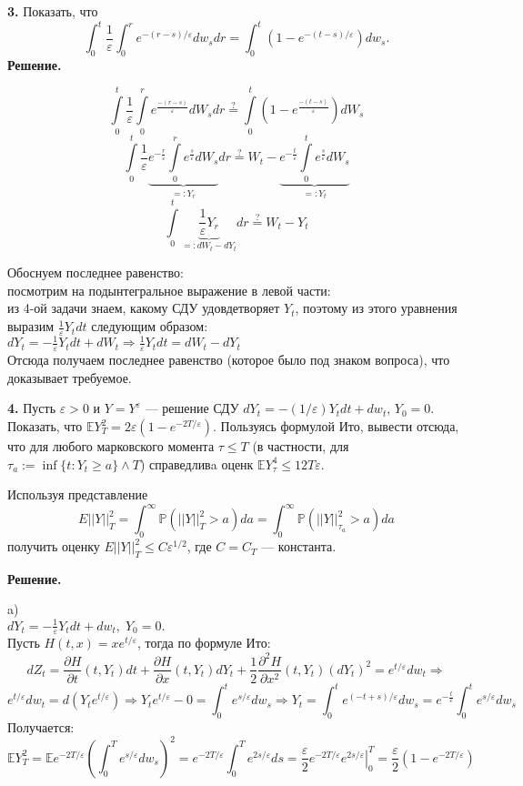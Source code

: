 \documentclass[12pt]{article}
\newcommand\E{{\mathbb E}}
\newcommand\e{{\varepsilon}}
\begin{document}
\bigskip
\noindent
{\bf 3.} Показать, что 
$$
\int_0^t  \frac 1\e \int_0^r e^{-(r-s)/\e}dw_sdr=\int_0^t(1-e^{-(t-s)/\e})dw_s. 
$$ 
\smallskip
{\bf  Решение.}  


$$\int\limits_0^t{\frac{1}{\varepsilon}\int\limits_0^r e^{\frac{-(r-s)}{\varepsilon}}dW_s}dr\stackrel{?}{=}\int\limits_0^t{ (1-e^{\frac{-(t-s)}{\varepsilon}})dW_s}$$
$$\int\limits_0^t{\frac{1}{\varepsilon}\underbrace{e^{-\frac{r}{\varepsilon}} \int\limits_0^r e^{\frac{s}{\varepsilon}}dW_s}_{=:Y_r}}dr\stackrel{?}{=}W_t-\underbrace{e^{-\frac{t}{\varepsilon}}\int\limits_0^t{ e^{\frac{s}{\varepsilon}}dW_s}}_{=:Y_t}$$
$$\int\limits_0^t  \underbrace{{\frac{1}{\varepsilon} Y_r}}_{=:dW_t-dY_t}dr \stackrel{?}{=} W_t-Y_t$$

Обоснуем последнее равенство:\\
посмотрим на подынтегральное выражение в левой части:\\
из 4-ой задачи знаем, какому СДУ удовдетворяет $Y_t$, поэтому из этого уравнения выразим $\frac{1}{\varepsilon}Y_tdt$ следующим образом:\\
 $dY_t=-\frac{1}{\varepsilon}Y_tdt+dW_t\Rightarrow \frac{1}{\varepsilon}Y_tdt = dW_t-dY_t$\\
 Отсюда получаем последнее равенство (которое было под знаком вопроса), что доказывает требуемое.


\bigskip 
\noindent
{\bf 4.} Пусть   $\e>0$ и $Y=Y^\e$ --- решение СДУ $dY_t=-(1/\e)Y_tdt+dw_t$, $Y_0=0$. 
Показать, что $\E Y^2_T=2\e(1-e^{-2T/\e})$. 
Пользуясь формулой Ито, вывести отсюда, что для любого марковского момента $\tau\le T$ (в частности,  для $\tau_a:=\inf\{t: Y_t\ge a\}\wedge T$) справедливa оценк $\E Y^4_\tau \le 12T\e$. 

Используя представление 
$$
E||Y||_T^2=\int_{0}^\infty {\mathbb P}(||Y||_T^2>a)da=\int_{0}^\infty {\mathbb P}(||Y||_{\tau_a}^2>a)da
$$
получить оценку $E||Y||_T^2\le C \e^{1/2}$, где $C=C_T$ --- константа. 

\smallskip
{\bf  Решение.}   


a) \\
$dY_t=-\frac 1\varepsilon Y_tdt+dw_t, \; Y_0=0.$ \\
Пусть $H(t,x)=xe^{t/\varepsilon}$, тогда по формуле Ито:\\
\[dZ_t=\frac{\partial H}{\partial t}(t, Y_t)dt+\frac{\partial H}{\partial x}(t, Y_t)dY_t+\frac 12 \frac{\partial^2 H}{\partial x^2}(t, Y_t)(dY_t)^2=e^{t/\varepsilon}dw_t \Rightarrow\] 
\[e^{t/\varepsilon}dw_t =d(Y_t e^{t/\varepsilon}) \Rightarrow Y_t e^{t/\varepsilon}-0=\int_0^t e^{s/\varepsilon}dw_s \Rightarrow Y_t=\int_0^t e^{(-t+s)/\varepsilon}dw_s =
e^{-\frac{t}{\varepsilon}} \int_0^t e^{s/\varepsilon}dw_s \] 
Получается: 
\[\E Y^2_T= \E e^{-2T/\varepsilon} \left(\int_0^T e^{s/\varepsilon}dw_s\right)^2= e^{-2T/\varepsilon} \int_0^T e^{2s/\varepsilon}ds=\frac \varepsilon2 e^{-2T/\varepsilon} \left. e^{2s/\varepsilon}\right|_0^T= \frac \varepsilon2 (1-e^{-2T/\varepsilon})\]
\end{document}
